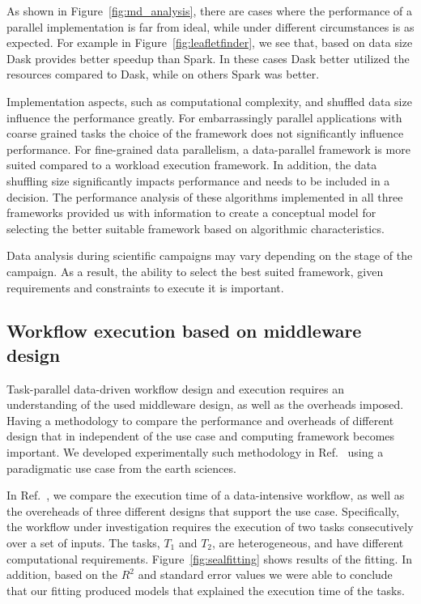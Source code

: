As shown in Figure~\ref{fig:md_analysis}, there are cases where the performance of a parallel implementation is far from ideal, while under different circumstances is as expected. 
For example in Figure~\ref{fig:leafletfinder}, we see that, based on data size Dask provides better speedup than Spark. 
In these cases Dask better utilized the resources compared to Dask, while on others Spark was better.

Implementation aspects, such as computational complexity, and shuffled data size influence the performance greatly. 
For embarrassingly parallel applications with coarse grained tasks the choice of the framework does not significantly influence performance. 
For fine-grained data parallelism, a data-parallel framework is more suited compared to a workload execution framework. 
In addition, the data shuffling size significantly impacts performance and needs to be included in a decision.
The performance analysis of these algorithms implemented in all three frameworks provided us with information to create a conceptual model for selecting the better suitable framework based on algorithmic characteristics.

Data analysis during scientific campaigns may vary depending on the stage of the campaign. 
As a result, the ability to select the best suited framework, given requirements and constraints to execute it is important. 

\subsection{Workflow execution based on middleware design}
\label{design_comp}
Task-parallel data-driven workflow design and execution requires an understanding of the used middleware design, as well as the overheads imposed.
Having a methodology to compare the performance and overheads of different design that in independent of the use case and computing framework becomes important.
We developed experimentally such methodology in Ref.~\cite{paraskevakos2019workflow} using a paradigmatic use case from the earth sciences.

In Ref.~\cite{paraskevakos2019workflow}, we compare the execution time of a data-intensive workflow, as well as the overeheads of three different designs that support the use case. 
Specifically, the workflow under investigation requires the execution of two tasks consecutively over a set of inputs. 
The tasks, $T_{1}$ and $T_{2}$, are heterogeneous, and have different computational requirements. 
Figure~\ref{fig:sealfitting} shows results of the fitting. 
In addition, based on the $R^{2}$ and standard error values we were able to conclude that our fitting produced models that explained the execution time of the tasks.


